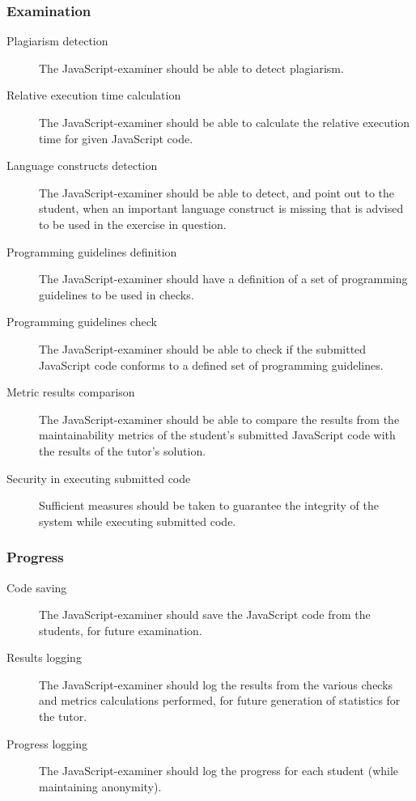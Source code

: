 \subsubsection{Examination}
\begin{description}
  \item[Plagiarism detection] The JavaScript-examiner should be able to detect
    plagiarism.
  \item[Relative execution time calculation] The JavaScript-examiner should be 
    able to calculate the relative execution time for given JavaScript code.
  \item[Language constructs detection] The JavaScript-examiner should be able
    to detect, and point out to the student, when an important language
    construct is missing that is advised to be used in the exercise in
    question.
  \item[Programming guidelines definition] The JavaScript-examiner should have
    a definition of a set of programming guidelines to be used in \glspl{check}.
  \item[Programming guidelines check] The JavaScript-examiner should be able to
    check if the submitted JavaScript code conforms to a defined set of
    programming guidelines.
  \item[Metric results comparison] The JavaScript-examiner should be able to
    compare the results from the maintainability metrics of the student's
    submitted JavaScript code with the results of the tutor's solution.
  \item[Security in executing submitted code] Sufficient measures should be
    taken to guarantee the integrity of the system while executing submitted
    code.
\end{description}

\subsubsection{Progress}
\begin{description}
  \item[Code saving] The JavaScript-examiner should save the JavaScript code
    from the students, for future examination.
  \item[Results logging] The JavaScript-examiner should log the results from
    the various \glspl{check} and metrics calculations performed, for future
    generation of statistics for the tutor.
  \item[Progress logging] The JavaScript-examiner should log the progress for each
    student (while maintaining anonymity).
\end{description}
